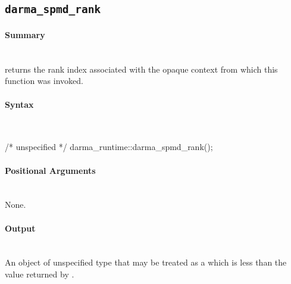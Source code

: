


\subsection{\texttt{darma\_spmd\_rank}}

\paragraph{Summary}\mbox{}\\
 returns the \gls{rank} index associated with the \gls{opaque context}
 from which this
function was invoked.

\paragraph{Syntax}\mbox{}\\
\begin{CppCode}
/* unspecified */ darma_runtime::darma_spmd_rank();
\end{CppCode}

\paragraph{Positional Arguments} \mbox{}\\
None. 

\paragraph{Output}\mbox{}\\
An object of unspecified type that may be treated as a 
which is less than the value returned by .

